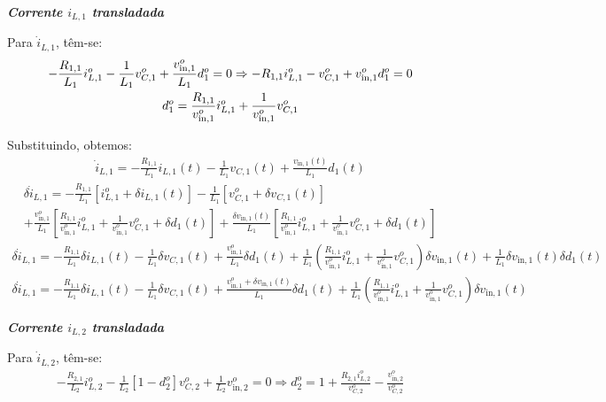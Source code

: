 \textbf{\textit{Corrente $i_{L,1}$ transladada}} \vspace*{12pt}

Para $\dot{i}_{L,1}$, têm-se:
\begin{gather}
  - \frac{R_{1,1}}{L_1} i_{L,1}^o - \frac{1}{L_1} v_{C,1}^o + \frac{v_{\text{in}, 1}^o}{L_1} d_1^o = 0 \Rightarrow
  - R_{1,1} i_{L,1}^o - v_{C,1}^o + v_{\text{in}, 1}^o d_1^o = 0 \nle
  d_1^o = \frac{R_{1,1}}{v_{\text{in}, 1}^o} i_{L,1}^o + \frac{1}{v_{\text{in}, 1}^o} v_{C,1}^o
\end{gather}

Substituindo, obtemos:
\begin{gather*}
  \dot{i}_{L,1} = - \frac{R_{1,1}}{L_1} i_{L,1}(t) - \frac{1}{L_1} v_{C,1}(t) + \frac{v_{\text{in}, 1}(t)}{L_1} d_1(t)
\end{gather*}
\begin{multline*}
  \delta \dot{i}_{L,1} = - \frac{R_{1,1}}{L_1} \left[i_{L,1}^o + \delta i_{L,1}(t)\right]
  - \frac{1}{L_1} \left[v_{C,1}^o + \delta v_{C,1}(t)\right] \\
  + \frac{v_{\text{in}, 1}^o}{L_1} \left[\frac{R_{1,1}}{v_{\text{in}, 1}^o} i_{L,1}^o + \frac{1}{v_{\text{in}, 1}^o} v_{C,1}^o + \delta d_1(t)\right] 
  + \frac{ \delta v_{\text{in}, 1}(t)}{L_1} \left[\frac{R_{1,1}}{v_{\text{in}, 1}^o} i_{L,1}^o + \frac{1}{v_{\text{in}, 1}^o} v_{C,1}^o + \delta d_1(t)\right]
\end{multline*}
\begin{gather*}
  \delta \dot{i}_{L,1} = - \frac{R_{1,1}}{L_1} \delta i_{L,1}(t) - \frac{1}{L_1} \delta v_{C,1}(t) + \frac{v_{\text{in}, 1}^o}{L_1} \delta d_1(t) + 
  \frac{1}{L_1} \left(\frac{R_{1,1}}{v_{\text{in}, 1}^o} i_{L,1}^o + \frac{1}{v_{\text{in}, 1}^o} v_{C,1}^o\right) \delta v_{\text{in}, 1}(t) 
  + \frac{1}{L_1} \delta v_{\text{in}, 1}(t) \delta d_1(t)
\end{gather*}
\begin{gather}
  \delta \dot{i}_{L,1} = - \frac{R_{1,1}}{L_1} \delta i_{L,1}(t) - \frac{1}{L_1} \delta v_{C,1}(t) 
  + \frac{v_{\text{in}, 1}^o + \delta v_{\text{in}, 1}(t)}{L_1} \delta d_1(t) + 
  \frac{1}{L_1} \left(\frac{R_{1,1}}{v_{\text{in}, 1}^o} i_{L,1}^o + \frac{1}{v_{\text{in}, 1}^o} v_{C,1}^o\right) \delta v_{\text{in}, 1}(t) 
\end{gather}

\textbf{\textit{Corrente $i_{L,2}$ transladada}} \vspace*{12pt}

Para $\dot{i}_{L,2}$, têm-se:
\begin{gather}
  - \frac{R_{2,1}}{L_2} i_{L,2}^o - \frac{1}{L_2} \left[1 - d_2^o\right] v_{C,2}^o + \frac{1}{L_2} v_{\text{in},2}^o = 0 \Rightarrow
  d_2^o = 1 + \frac{R_{2,1}i_{L,2}^o}{v_{C,2}^o} - \frac{v_{\text{in},2}^o}{v_{C,2}^o}
\end{gather}

